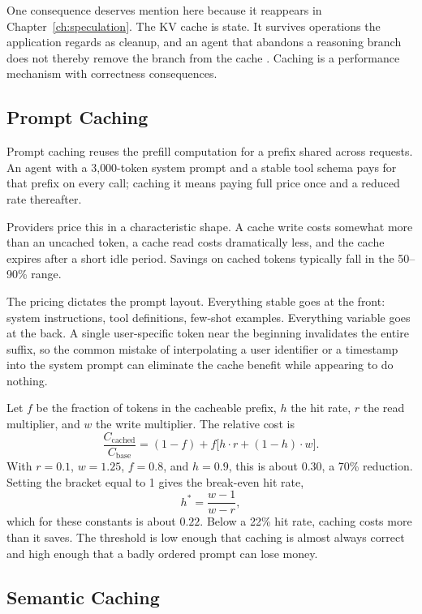 \documentclass[11pt]{book}
\begin{document}
One consequence deserves mention here because it reappears in Chapter~\ref{ch:speculation}. The KV cache is state. It survives operations the application regards as cleanup, and an agent that abandons a reasoning branch does not thereby remove the branch from the cache \cite{abortedkv2026}. Caching is a performance mechanism with correctness consequences.

\subsection{Prompt Caching}

Prompt caching reuses the prefill computation for a prefix shared across requests. An agent with a 3{,}000-token system prompt and a stable tool schema pays for that prefix on every call; caching it means paying full price once and a reduced rate thereafter.

Providers price this in a characteristic shape. A cache write costs somewhat more than an uncached token, a cache read costs dramatically less, and the cache expires after a short idle period. Savings on cached tokens typically fall in the 50--90\% range.

The pricing dictates the prompt layout. Everything stable goes at the front: system instructions, tool definitions, few-shot examples. Everything variable goes at the back. A single user-specific token near the beginning invalidates the entire suffix, so the common mistake of interpolating a user identifier or a timestamp into the system prompt can eliminate the cache benefit while appearing to do nothing.

Let $f$ be the fraction of tokens in the cacheable prefix, $h$ the hit rate, $r$ the read multiplier, and $w$ the write multiplier. The relative cost is
\[
\frac{C_{\text{cached}}}{C_{\text{base}}} = (1-f) + f\big[h \cdot r + (1-h)\cdot w\big].
\]
With $r = 0.1$, $w = 1.25$, $f = 0.8$, and $h = 0.9$, this is about $0.30$, a 70\% reduction. Setting the bracket equal to 1 gives the break-even hit rate,
\[
h^{*} = \frac{w-1}{w-r},
\]
which for these constants is about $0.22$. Below a 22\% hit rate, caching costs more than it saves. The threshold is low enough that caching is almost always correct and high enough that a badly ordered prompt can lose money.

\subsection{Semantic Caching}
\end{document}
